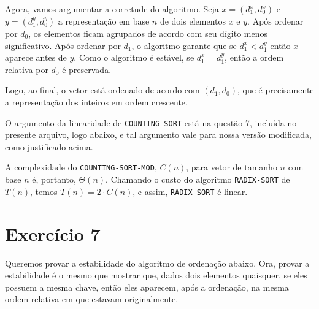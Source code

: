 \documentclass[a4paper,12pt]{article}
\begin{document}

Agora, vamos argumentar a corretude do algoritmo. Seja $x = (d_1^x, d_0^x)$ e $y = (d_1^y, d_0^y)$ a representação em base $n$ de dois elementos $x$ e $y$.  Após ordenar por $d_0$, os elementos ficam agrupados de acordo com seu dígito menos significativo. Após ordenar por $d_1$, o algoritmo garante que se $d_1^x < d_1^y$ então $x$ aparece antes de $y$. Como o algoritmo é estável, se $d_1^x = d_1^y$, então a ordem relativa por $d_0$ é preservada.

Logo, ao final, o vetor está ordenado de acordo com $(d_1, d_0)$, que é precisamente a representação dos inteiros em ordem crescente.

O argumento da linearidade de \texttt{COUNTING-SORT} está na questão 7, incluída no presente arquivo, logo abaixo, e tal argumento vale para nossa versão modificada, como justificado acima.

A complexidade do \texttt{COUNTING-SORT-MOD}, $C(n)$, para vetor de tamanho $n$ com base $n$ é, portanto, $\Theta(n)$. Chamando o custo do algoritmo \texttt{RADIX-SORT} de $T(n)$, temos $T(n) = 2 \cdot C(n)$, e assim, \texttt{RADIX-SORT} é linear.

\newpage

\section*{Exercício 7}

Queremos provar a estabilidade do algoritmo de ordenação abaixo. Ora, provar a estabilidade é o mesmo que mostrar que, dados dois elementos quaisquer, se eles possuem a mesma chave, então eles aparecem, após a ordenação, na mesma ordem relativa em que estavam originalmente.
\end{document}
